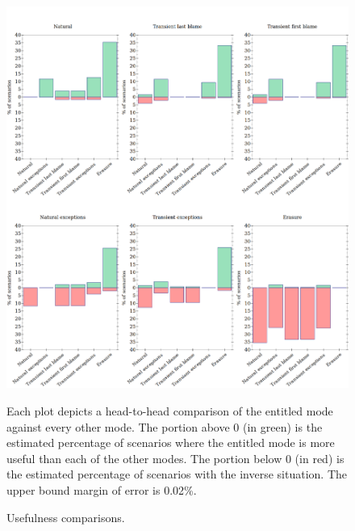 \begin{figure}
  \centering
  \includegraphics[width=\textwidth]{./plots/avo-bars}

  \vspace{1em}
  \begin{minipage}{0.95\textwidth}
  Each plot depicts a head-to-head comparison of the entitled mode against every other mode.
  The portion above 0 (in green) is the estimated percentage of scenarios where the entitled mode is more useful than each of the other modes.
  The portion below 0 (in red) is the estimated percentage of scenarios with the inverse situation.
  The upper bound margin of error is 0.02\%.
  \end{minipage}

  \caption{Usefulness comparisons.}
  \label{fig:avo-bars}
\end{figure}

